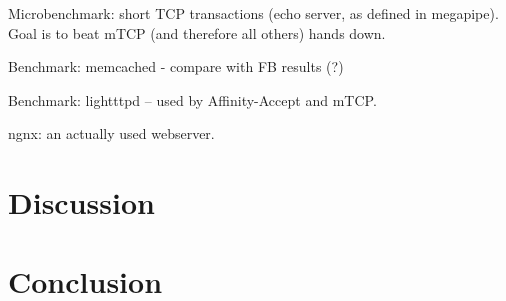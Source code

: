 \todo Microbenchmark: short TCP transactions (echo server, as defined in megapipe).   Goal is to beat mTCP (and therefore all others) hands down.

\todo Benchmark: memcached - compare with FB results (?)

\todo Benchmark: lightttpd -- used by Affinity-Accept and mTCP.  

\todo ngnx: an actually used webserver.


\section{Discussion}
\section{Conclusion}




